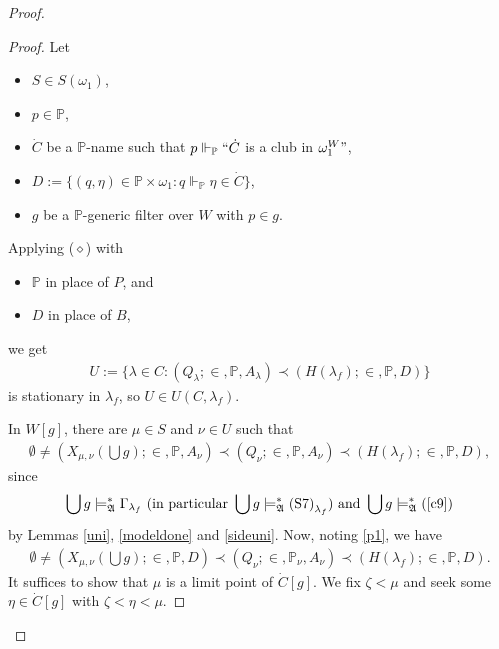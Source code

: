 \documentclass[12pt]{article}
\numberwithin{equation}{section}
\begin{document}
\begin{proof}
\begin{proof}
Let 
\begin{itemize}
    \item $S \in S(\omega_1)$,
    \item $p \in \mathbb{P}$,
    \item $\dot{C}$ be a $\mathbb{P}$-name such that $p \Vdash_{\mathbb{P}} ``\dot{C}$ is a club in $\omega_1^W"$,
    \item $D := \{(q, \eta) \in \mathbb{P} \times \omega_1 : q \Vdash_{\mathbb{P}} \eta \in \dot{C}\}$,
    \item $g$ be a $\mathbb{P}$-generic filter over $W$ with $p \in g$.
\end{itemize}
Applying ($\diamond$) with 
\begin{itemize}
    \item $\mathbb{P}$ in place of $P$, and
    \item $D$ in place of $B$,
\end{itemize}
we get
\begin{align*}
    U := \{\lambda \in C : (Q_{\lambda}; \in, \mathbb{P}, A_{\lambda}) \prec (H(\lambda_f); \in, \mathbb{P}, D)\}
\end{align*}
is stationary in $\lambda_f$, so $U \in U(C, \lambda_f)$.

In $W[g]$, there are $\mu \in S$ and $\nu \in U$ such that 
\begin{align*}
    \emptyset \neq (X_{\mu, \nu}(\bigcup g); \in, \mathbb{P}, A_{\nu}) \prec (Q_{\nu}; \in, \mathbb{P}, A_{\nu}) \prec (H(\lambda_f); \in, \mathbb{P}, D),
\end{align*}
since $$\bigcup g \models^*_{\mathfrak{A}} \Gamma_{\lambda_f} \text{ (in particular } \bigcup g \models^*_{\mathfrak{A}} \text{(S7)}_{\lambda_f} \text{) and } \bigcup g \models^*_{\mathfrak{A}} \text{(}\ref{c9}\text{)}$$ by Lemmas \ref{uni}, \ref{modeldone} and \ref{sideuni}. Now, noting \ref{p1}, we have 
\begin{align}\label{eseq}
    \emptyset \neq (X_{\mu, \nu}(\bigcup g); \in, \mathbb{P}, D) \prec (Q_{\nu}; \in, \mathbb{P}_{\nu}, A_{\nu}) \prec (H(\lambda_f); \in, \mathbb{P}, D).
\end{align}
It suffices to show that $\mu$ is a limit point of $\dot{C}[g]$. We fix $\zeta < \mu$ and seek some $\eta \in \dot{C}[g]$ with $\zeta < \eta < \mu$. 


\end{proof}
\end{proof}
\end{document}

